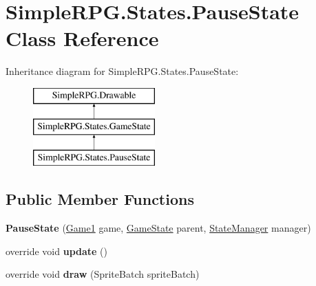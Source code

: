 \hypertarget{class_simple_r_p_g_1_1_states_1_1_pause_state}{\section{Simple\+R\+P\+G.\+States.\+Pause\+State Class Reference}
\label{class_simple_r_p_g_1_1_states_1_1_pause_state}
}
Inheritance diagram for Simple\+R\+P\+G.\+States.\+Pause\+State\+:\begin{figure}[H]
\begin{center}
\leavevmode
\includegraphics[height=3.000000cm]{class_simple_r_p_g_1_1_states_1_1_pause_state}
\end{center}
\end{figure}
\subsection*{Public Member Functions}
\begin{DoxyCompactItemize}
\item 
\hypertarget{class_simple_r_p_g_1_1_states_1_1_pause_state_a70f5183636726b5ec49cfc05636083a6}{{\bfseries Pause\+State} (\hyperlink{class_simple_r_p_g_1_1_game1}{Game1} game, \hyperlink{class_simple_r_p_g_1_1_states_1_1_game_state}{Game\+State} parent, \hyperlink{class_simple_r_p_g_1_1_states_1_1_state_manager}{State\+Manager} manager)}\label{class_simple_r_p_g_1_1_states_1_1_pause_state_a70f5183636726b5ec49cfc05636083a6}

\item 
\hypertarget{class_simple_r_p_g_1_1_states_1_1_pause_state_a3c042a639731a387501b22ec6f5cbd41}{override void {\bfseries update} ()}\label{class_simple_r_p_g_1_1_states_1_1_pause_state_a3c042a639731a387501b22ec6f5cbd41}

\item 
\hypertarget{class_simple_r_p_g_1_1_states_1_1_pause_state_aa364801aece7b7497a0f09fe3fc41085}{override void {\bfseries draw} (Sprite\+Batch sprite\+Batch)}\label{class_simple_r_p_g_1_1_states_1_1_pause_state_aa364801aece7b7497a0f09fe3fc41085}

\end{DoxyCompactItemize}
